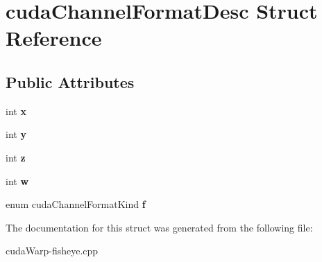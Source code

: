 \hypertarget{structcudaChannelFormatDesc}{}\section{cuda\+Channel\+Format\+Desc Struct Reference}
\label{structcudaChannelFormatDesc}
\subsection*{Public Attributes}
\begin{DoxyCompactItemize}
\item 
int {\bfseries x}\hypertarget{structcudaChannelFormatDesc_a70dede802100e2acd9f334326e9d7926}{}\label{structcudaChannelFormatDesc_a70dede802100e2acd9f334326e9d7926}

\item 
int {\bfseries y}\hypertarget{structcudaChannelFormatDesc_a6570793c6567d0c704e8e8943ccaec43}{}\label{structcudaChannelFormatDesc_a6570793c6567d0c704e8e8943ccaec43}

\item 
int {\bfseries z}\hypertarget{structcudaChannelFormatDesc_ae371d37d940d2397139b0a3b7302f51a}{}\label{structcudaChannelFormatDesc_ae371d37d940d2397139b0a3b7302f51a}

\item 
int {\bfseries w}\hypertarget{structcudaChannelFormatDesc_a06089c5a407a2cbd6ea05e5a39b19d69}{}\label{structcudaChannelFormatDesc_a06089c5a407a2cbd6ea05e5a39b19d69}

\item 
enum cuda\+Channel\+Format\+Kind {\bfseries f}\hypertarget{structcudaChannelFormatDesc_a7d561d361936688eeae79c3184698278}{}\label{structcudaChannelFormatDesc_a7d561d361936688eeae79c3184698278}

\end{DoxyCompactItemize}


The documentation for this struct was generated from the following file\+:\begin{DoxyCompactItemize}
\item 
cuda\+Warp-\/fisheye.\+cpp\end{DoxyCompactItemize}

